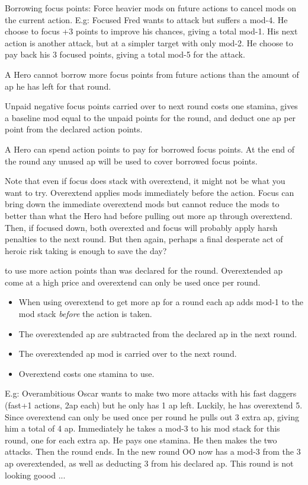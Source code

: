 Borrowing focus points: Force heavier mods on future actions to cancel mods on the current action. E.g: Focused Fred wants to attack but suffers a mod-4. He choose to focus +3 points to improve his chances, giving a total mod-1. His next action is another attack, but at a simpler target with only mod-2. He choose to pay back his 3 focused points, giving a total mod-5 for the attack.

A Hero cannot borrow more focus points from future actions than the amount of ap he has left for that round.

Unpaid negative focus points carried over to next round costs one stamina, gives a baseline mod equal to the unpaid points for the round, and deduct one ap per point from the declared action points.

A Hero can spend action points to pay for borrowed focus points. At the end of the round any unused ap will be used to cover borrowed focus points.

Note that even if focus does stack with overextend, it might not be what you want to try. Overextend applies mods immediately before the action. Focus can bring down the immediate overextend mods but cannot reduce the mods to better than what the Hero had before pulling out more ap through overextend. Then, if focused down, both overexted and focus will probably apply harsh penalties to the next round. But then again, perhaps a final desperate act of heroic risk taking is enough to save the day?


 to use more action points than was declared for the round. Overextended ap come at a high price and overextend can only be used once per round.
\begin{itemize}
    \item When using overextend to get more ap for a round each ap adds mod-1 to the mod stack \emph{before} the action is taken.
    \item The overextended ap are subtracted from the declared ap in the next round.
    \item The overextended ap mod is carried over to the next round.
    \item Overextend costs one stamina to use.
\end{itemize}

E.g: Overambitious Oscar wants to make two more attacks with his fast daggers (fast+1 actions, 2ap each) but he only has 1 ap left. Luckily, he has overextend 5. Since overextend can only be used once per round he pulls out 3 extra ap, giving him a total of 4 ap. Immediately he takes a mod-3 to his mod stack for this round, one for each extra ap. He pays one stamina. He then makes the two attacks. Then the round ends. In the new round OO now has a mod-3 from the 3 ap overextended, as well as deducting 3 from his declared ap. This round is not looking goood ...


